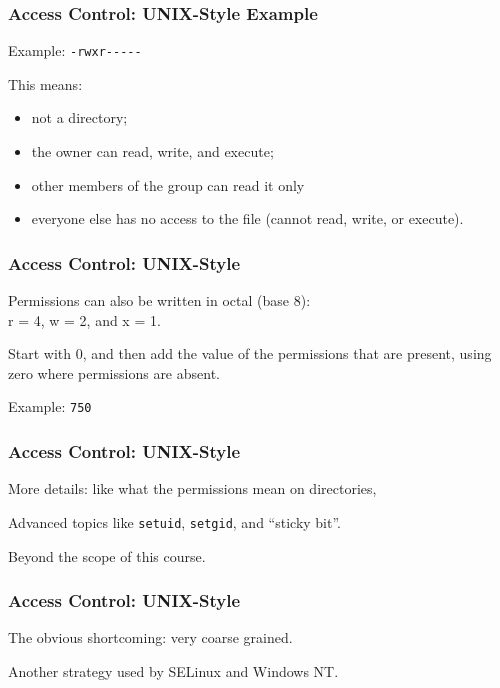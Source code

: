 \begin{frame}
\frametitle{Access Control: UNIX-Style Example}
\begin{changemargin}{1cm}

Example: \texttt{-rwxr{-}{-}{-}{-}{-}} 

This means:
\begin{itemize}
\item not a directory; 
\item the owner can read, write, and execute; 
\item other members of the group can read it only
\item everyone else has no access to the file (cannot read, write, or execute).
\end{itemize}

\end{changemargin}
\end{frame}

\begin{frame}
\frametitle{Access Control: UNIX-Style}
\begin{changemargin}{1cm}

Permissions can also be written in octal (base 8): \\
\quad r = 4, w = 2, and x = 1. 

Start with 0, and then add the value of the  permissions that are present, using zero where permissions are absent. 

Example: \texttt{750} 

\end{changemargin}
\end{frame}

\begin{frame}
\frametitle{Access Control: UNIX-Style}
\begin{changemargin}{1cm}

More details: like what the permissions mean on directories, 

Advanced topics like \texttt{setuid}, \texttt{setgid}, and ``sticky bit''.

Beyond the scope of this course.

\end{changemargin}
\end{frame}

\begin{frame}
\frametitle{Access Control: UNIX-Style}
\begin{changemargin}{1cm}

The obvious shortcoming: very coarse grained.

Another strategy used by SELinux and Windows NT.

\end{changemargin}
\end{frame}

